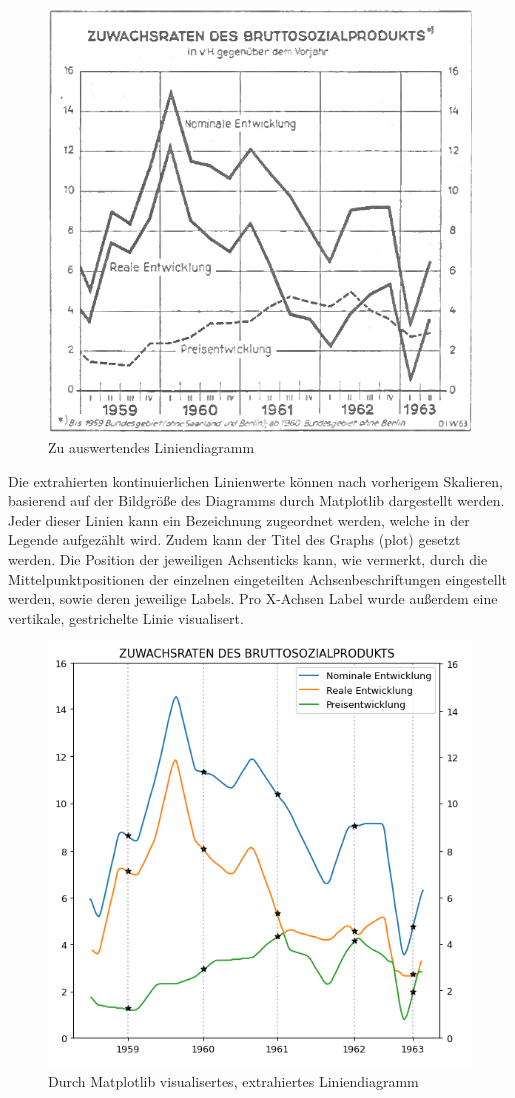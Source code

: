 \begin{figure}[h!]
    \centering
    \captionsetup{width=.75\linewidth}
    \includegraphics[width=.75\textwidth]{Implementation/img/extraction_input2.png}
    \caption{ Zu auswertendes Liniendiagramm}
    \label{fig:extraction_input}
\end{figure}

Die extrahierten kontinuierlichen Linienwerte können nach vorherigem Skalieren, basierend auf der Bildgröße des Diagramms durch Matplotlib dargestellt werden. Jeder dieser Linien kann ein Bezeichnung zugeordnet werden, welche in der Legende aufgezählt wird. Zudem kann der Titel des Graphs (plot) gesetzt werden. Die Position der jeweiligen Achsenticks kann, wie vermerkt, durch die Mittelpunktpositionen der einzelnen eingeteilten Achsenbeschriftungen eingestellt werden, sowie deren jeweilige Labels. Pro X-Achsen Label wurde außerdem eine vertikale, gestrichelte Linie visualisert.

\begin{figure}[h!]
    \centering
    \captionsetup{width=.75\linewidth}
    \includegraphics[width=.75\textwidth]{Implementation/img/extraction_output2.png}
    \caption{ Durch Matplotlib visualisertes, extrahiertes Liniendiagramm}
    \label{fig:extraction_output}
\end{figure}

